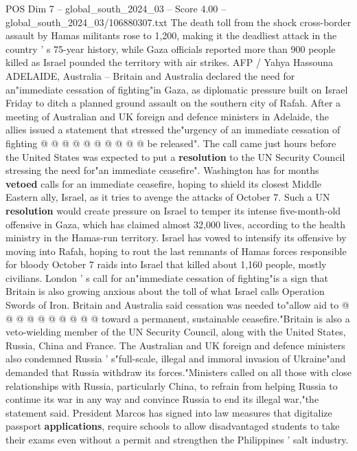 \begin{textsample}{POS Dim 7 – global\_south\_2024\_03 – Score 4.00 – global\_south\_2024\_03/106880307.txt}
The death toll from the shock cross-border assault by Hamas militants rose to 1,200, making it the deadliest attack in the country ' s 75-year history, while Gaza officials reported more than 900 people killed as Israel pounded the territory with air strikes.
AFP / Yahya Hassouna ADELAIDE, Australia -- Britain and Australia declared the need for an"immediate cessation of fighting"in Gaza, as diplomatic pressure built on Israel Friday to ditch a planned ground assault on the southern city of Rafah.
After a meeting of Australian and UK foreign and defence ministers in Adelaide, the allies issued a statement that stressed the"urgency of an immediate cessation of fighting @ @ @ @ @ @ @ @ @ @ be released".
The call came just hours before the United States was expected to put a \textbf{resolution} to the UN Security Council stressing the need for"an immediate ceasefire".
Washington has for months \textbf{vetoed} calls for an immediate ceasefire, hoping to shield its closest Middle Eastern ally, Israel, as it tries to avenge the attacks of October 7.
Such a UN \textbf{resolution} would create pressure on Israel to temper its intense five-month-old offensive in Gaza, which has claimed almost 32,000 lives, according to the health ministry in the Hamas-run territory.
Israel has vowed to intensify its offensive by moving into Rafah, hoping to rout the last remnants of Hamas forces responsible for bloody October 7 raids into Israel that killed about 1,160 people, mostly civilians.
London ' s call for an"immediate cessation of fighting"is a sign that Britain is also growing anxious about the toll of what Israel calls Operation Swords of Iron.
Britain and Australia said cessation was needed to"allow aid to @ @ @ @ @ @ @ @ @ @ toward a permanent, sustainable ceasefire."Britain is also a veto-wielding member of the UN Security Council, along with the United States, Russia, China and France.
The Australian and UK foreign and defence ministers also condemned Russia ' s"full-scale, illegal and immoral invasion of Ukraine"and demanded that Russia withdraw its forces."Ministers called on all those with close relationships with Russia, particularly China, to refrain from helping Russia to continue its war in any way and convince Russia to end its illegal war,"the statement said.
President Marcos has signed into law measures that digitalize passport \textbf{applications}, require schools to allow disadvantaged students to take their exams even without a permit and strengthen the Philippines ' salt industry.

\end{textsample}

